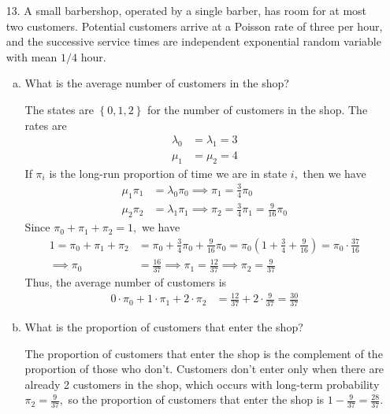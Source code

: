 \documentclass{article}
\begin{document}
\begin{itemize}
	\item[13.] A small barbershop, operated by a single barber, has room for at most two customers. Potential customers arrive at a Poisson rate of three per hour, and the successive service times are independent exponential random variable with mean $1/4$ hour.
		\begin{enumerate}[(a)]
			\item What is the average number of customers in the shop?
				\begin{soln}
					The states are $\left\{ 0, 1, 2 \right\}$ for the number of customers in the shop. The rates are
					\begin{align*}
						\lambda_0 &= \lambda_1 = 3 \\
						\mu_1 &= \mu_2 = 4
					\end{align*}
					If $\pi_i$ is the long-run proportion of time we are in state $i,$ then we have
					\begin{align*}
						\mu_1 \pi_1 &= \lambda_0 \pi_0 \implies \pi_1 = \frac{3}{4} \pi_0 \\
						\mu_2 \pi_2 &= \lambda_1 \pi_1 \implies \pi_2 = \frac{3}{4} \pi_1 = \frac{9}{16} \pi_0
					\end{align*}
					Since $\pi_0+\pi_1+\pi_2=1,$ we have
					\begin{align*}
						1=\pi_0 + \pi_1 + \pi_2 &= \pi_0 + \frac{3}{4} \pi_0 + \frac{9}{16} \pi_0 = \pi_0 \left( 1+\frac{3}{4} + \frac{9}{16}  \right) = \pi_0\cdot \frac{37}{16} \\
						\implies \pi_0 &= \frac{16}{37} \implies \pi_1 = \frac{12}{37} \implies \pi_2 = \frac{9}{37}
					\end{align*}
					Thus, the average number of customers is
					\begin{align*}
						0\cdot \pi_0 + 1\cdot \pi_1 + 2\cdot \pi_2 &= \frac{12}{37} + 2\cdot \frac{9}{37} = \frac{30}{37}
					\end{align*}
				\end{soln}

			\item What is the proportion of customers that enter the shop?
				\begin{soln}
					The proportion of customers that enter the shop is the complement of the proportion of those who don't. Customers don't enter only when there are already 2 customers in the shop, which occurs with long-term probability $\pi_2 = \frac{9}{37},$ so the proportion of customers that enter the shop is $1-\frac{9}{37} = \frac{28}{37}.$
				\end{soln}


\end{enumerate}
\end{itemize}
\end{document}
